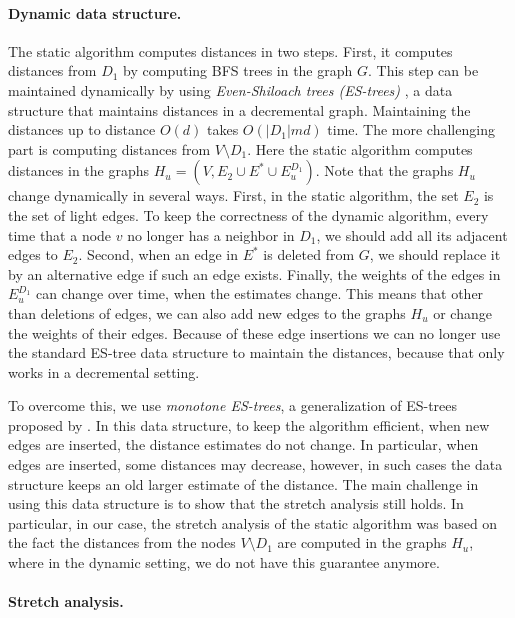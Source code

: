 \paragraph{Dynamic data structure.} 
The static algorithm computes distances in two steps. First, it computes distances from $D_1$ by computing BFS trees in the graph $G$. This step can be maintained dynamically by using \emph{Even-Shiloach trees (ES-trees)} \cite{ES81}, a data structure that maintains distances in a decremental graph. Maintaining the distances up to distance $O(d)$ takes $O(|D_1|md)$ time.
The more challenging part is computing distances from $V \setminus D_1$. Here the static algorithm computes distances in the graphs $H_u=(V, E_2 \cup E^* \cup E^{D_1}_u)$. Note that the graphs $H_u$ change dynamically in several ways. First, in the static algorithm, the set $E_2$ is the set of light edges. To keep the correctness of the dynamic algorithm, every time that a node $v$ no longer has a neighbor in $D_1$, we should add all its adjacent edges to $E_2$. Second, when an edge in $E^*$ is deleted from $G$, we should replace it by an alternative edge if such an edge exists. Finally, the weights of the edges in $E^{D_1}_u$ can change over time, when the estimates change. This means that other than deletions of edges, we can also add new edges to the graphs $H_u$ or change the weights of their edges. Because of these edge insertions we can no longer use the standard ES-tree data structure to maintain the distances, because that only works in a decremental setting. 

To overcome this, we use \emph{monotone ES-trees}, a generalization of ES-trees proposed by \cite{HKN2016,HKN14}. In this data structure, to keep the algorithm efficient, when new edges are inserted, the distance estimates do not change. In particular, when edges are inserted, some distances may decrease, however, in such cases the data structure keeps an old larger estimate of the distance. The main challenge in using this data structure is to show that the stretch analysis still holds. In particular, in our case, the stretch analysis of the static algorithm was based on the fact the distances from the nodes $V \setminus D_1$ are computed in the graphs $H_u$, where in the dynamic setting, we do not have this guarantee anymore.  

\paragraph{Stretch analysis.}

